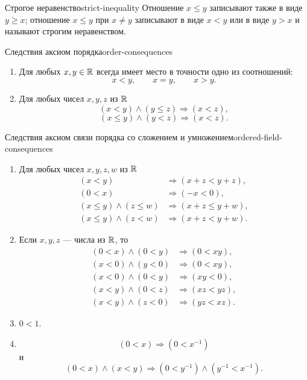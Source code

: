 \begin{definition}{Строгое неравенство}{strict-inequality}
  Отношение $x\le y$ записывают также в виде $y\ge x$; отношение $x\le y$
  при $x\ne y$ записывают в виде $x<y$ или в виде $y>x$ и называют строгим
  неравенством.
\end{definition}

\begin{properties}{Следствия аксиом порядка}{order-consequences}
  \begin{enumerate}[label=\arabic*${}^{\circ}$.]
    \item Для любых $x,y\in\mathbb{R}$ всегда имеет место в точности одно из
      соотношений:
      \[
        x<y,\qquad x=y,\qquad x>y.
      \]\par
    \item Для любых чисел $x,y,z$ из $\mathbb{R}$
      \[
        (x<y)\land(y\le z)\Rightarrow(x<z),
      \]
      \[
        (x\le y)\land(y<z)\Rightarrow(x<z).
      \]
  \end{enumerate}
\end{properties}

\begin{properties}{Следствия аксиом связи порядка со сложением и умножением}{ordered-field-consequences}
  \begin{enumerate}[label=\arabic*${}^{\circ}$.]
    \item Для любых чисел $x,y,z,w$ из $\mathbb{R}$
      \[
        \begin{aligned}
          (x<y)&\Rightarrow(x+z<y+z),\\
          (0<x)&\Rightarrow(-x<0),\\
          (x\le y)\land(z\le w)&\Rightarrow(x+z\le y+w),\\
          (x\le y)\land(z<w)&\Rightarrow(x+z<y+w).
        \end{aligned}
      \]\par
    \item Если $x,y,z$ — числа из $\mathbb{R}$, то
      \[
        \begin{aligned}
          (0<x)\land(0<y)&\Rightarrow(0<xy),\\
          (x<0)\land(y<0)&\Rightarrow(0<xy),\\
          (x<0)\land(0<y)&\Rightarrow(xy<0),\\
          (x<y)\land(0<z)&\Rightarrow(xz<yz),\\
          (x<y)\land(z<0)&\Rightarrow(yz<xz).
        \end{aligned}
      \]\par
    \item $0<1$.\par
    \item
      \[
        (0<x)\Rightarrow(0<x^{-1})
      \]
      и
      \[
        (0<x)\land(x<y)\Rightarrow(0<y^{-1})\land(y^{-1}<x^{-1}).
      \]
  \end{enumerate}
\end{properties}

